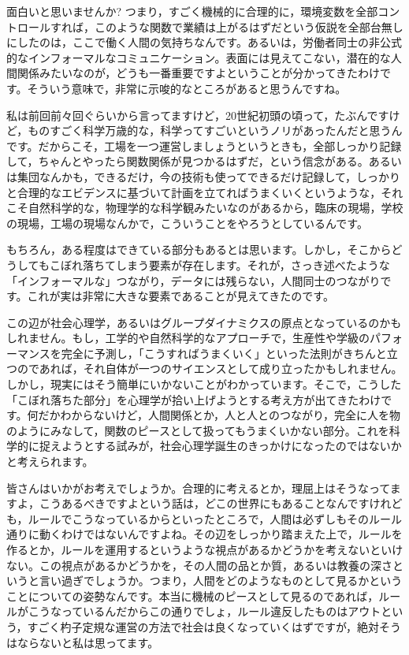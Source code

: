 \documentclass{ltjsbook}
\begin{document}
面白いと思いませんか? つまり，すごく機械的に合理的に，環境変数を全部コントロールすれば，このような関数で業績は上がるはずだという仮説を全部台無しにしたのは，ここで働く人間の気持ちなんです。あるいは，労働者同士の非公式的なインフォーマルなコミュニケーション。表面には見えてこない，潜在的な人間関係みたいなのが，どうも一番重要ですよということが分かってきたわけです。そういう意味で，非常に示唆的なところがあると思うんですね。

私は前回前々回ぐらいから言ってますけど，20世紀初頭の頃って，たぶんですけど，ものすごく科学万歳的な，科学ってすごいというノリがあったんだと思うんです。だからこそ，工場を一つ運営しましょうというときも，全部しっかり記録して，ちゃんとやったら関数関係が見つかるはずだ，という信念がある。あるいは集団なんかも，できるだけ，今の技術も使ってできるだけ記録して，しっかりと合理的なエビデンスに基づいて計画を立てればうまくいくというような，それこそ自然科学的な，物理学的な科学観みたいなのがあるから，臨床の現場，学校の現場，工場の現場なんかで，こういうことをやろうとしているんです。

もちろん，ある程度はできている部分もあるとは思います。しかし，そこからどうしてもこぼれ落ちてしまう要素が存在します。それが，さっき述べたような「インフォーマルな」つながり，データには残らない，人間同士のつながりです。これが実は非常に大きな要素であることが見えてきたのです。

この辺が社会心理学，あるいはグループダイナミクスの原点となっているのかもしれません。もし，工学的や自然科学的なアプローチで，生産性や学級のパフォーマンスを完全に予測し，「こうすればうまくいく」といった法則がきちんと立つのであれば，それ自体が一つのサイエンスとして成り立ったかもしれません。しかし，現実にはそう簡単にいかないことがわかっています。そこで，こうした「こぼれ落ちた部分」を心理学が拾い上げようとする考え方が出てきたわけです。何だかわからないけど，人間関係とか，人と人とのつながり，完全に人を物のようにみなして，関数のピースとして扱ってもうまくいかない部分。これを科学的に捉えようとする試みが，社会心理学誕生のきっかけになったのではないかと考えられます。

皆さんはいかがお考えでしょうか。合理的に考えるとか，理屈上はそうなってますよ，こうあるべきですよという話は，どこの世界にもあることなんですけれども，ルールでこうなっているからといったところで，人間は必ずしもそのルール通りに動くわけではないんですよね。その辺をしっかり踏まえた上で，ルールを作るとか，ルールを運用するというような視点があるかどうかを考えないといけない。この視点があるかどうかを，その人間の品とか質，あるいは教養の深さというと言い過ぎでしょうか。つまり，人間をどのようなものとして見るかということについての姿勢なんです。本当に機械のピースとして見るのであれば，ルールがこうなっているんだからこの通りでしょ，ルール違反したものはアウトという，すごく杓子定規な運営の方法で社会は良くなっていくはずですが，絶対そうはならないと私は思ってます。
\end{document}
